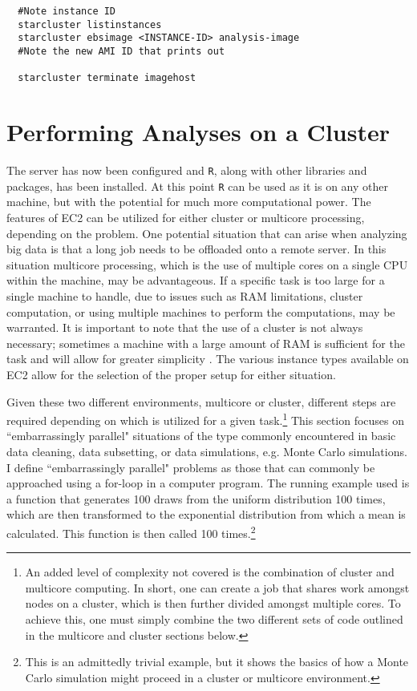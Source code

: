 \documentclass[12pt, letterpaper]{article}
\begin{document}
\begin{verbatim}  
  #Note instance ID
  starcluster listinstances 
  starcluster ebsimage <INSTANCE-ID> analysis-image 
  #Note the new AMI ID that prints out 
  
  starcluster terminate imagehost
\end{verbatim}

\section*{Performing Analyses on a Cluster}

The server has now been configured and \texttt{R}, along with other libraries and packages,
has been installed. At this point \texttt{R} can be used as it is on any other machine, but with the
potential for much more computational power. The features of EC2 can be utilized for
either cluster or multicore processing, depending on the problem. 
One potential situation that can arise when analyzing big data is that a long job needs to be offloaded onto a remote server.
In this situation multicore processing, which is the use of multiple cores
on a single CPU within the machine, may be advantageous. If a specific task
is too large for a single machine to handle, due to issues such as RAM limitations, 
cluster computation, or using multiple machines to perform the computations, may be warranted.
It is important to note that the use of a cluster is not
always necessary; sometimes a machine with a large amount of RAM is sufficient
for the task and will allow for greater simplicity \citep{hadoop}. The various instance
types available on EC2 allow for the selection of the proper setup for either 
situation. 

Given these two different environments, multicore or cluster, different steps are required
depending on which is utilized for a given task.\footnote{An added level of complexity not covered is the 
combination of cluster and multicore computing. In short, one can create a job that shares work amongst nodes
on a cluster, which is then further divided amongst multiple cores. To achieve this, one must
simply combine the two different sets of code outlined in the multicore and cluster sections below.}
This section focuses on ``embarrassingly parallel" situations of the type commonly encountered in basic
data cleaning, data subsetting, or data simulations, e.g. Monte Carlo simulations. I define ``embarrassingly parallel" 
problems as those that can commonly be approached using a for-loop in a 
computer program. The running example used is a function that  
generates 100 draws from the uniform distribution 100 times, which
are then transformed to the exponential distribution from which a mean is 
calculated. This function is then called 100 times.\footnote{This is an admittedly trivial example, 
but it shows the basics of how a Monte Carlo simulation might proceed in a cluster or multicore 
environment.}
\end{document}
